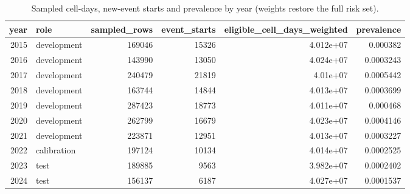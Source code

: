 \begin{table}
\caption{Sampled cell-days, new-event starts and prevalence by year (weights restore the full risk set).}
\label{tab:T1_dataset}
\begin{tabular}{rlrrrr}
\toprule
year & role & sampled_rows & event_starts & eligible_cell_days_weighted & prevalence \\
\midrule
2015 & development & 169046 & 15326 & 4.012e+07 & 0.000382 \\
2016 & development & 143990 & 13050 & 4.024e+07 & 0.0003243 \\
2017 & development & 240479 & 21819 & 4.01e+07 & 0.0005442 \\
2018 & development & 163744 & 14844 & 4.013e+07 & 0.0003699 \\
2019 & development & 287423 & 18773 & 4.011e+07 & 0.000468 \\
2020 & development & 262799 & 16679 & 4.023e+07 & 0.0004146 \\
2021 & development & 223871 & 12951 & 4.013e+07 & 0.0003227 \\
2022 & calibration & 197124 & 10134 & 4.014e+07 & 0.0002525 \\
2023 & test & 189885 & 9563 & 3.982e+07 & 0.0002402 \\
2024 & test & 156137 & 6187 & 4.027e+07 & 0.0001537 \\
\bottomrule
\end{tabular}
\end{table}
